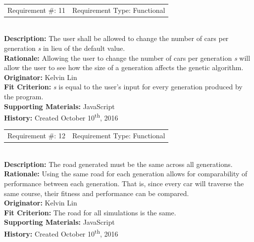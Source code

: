 \documentclass[12pt, titlepage]{article}
\begin{document}
\begin{reqbox}
	\begin{tabular}{cc}
		Requirement \#: 11 & Requirement Type: Functional \\
	\end{tabular} \\
	\textbf{Description:} The user shall be allowed to change the number of cars 
per 
	generation \textit{s} in lieu of the default value. \\
	\textbf{Rationale:} Allowing the user to change the number of cars per 
	generation \textit{s} will allow the user to see how the size of a generation 
	affects the genetic algorithm. \\
	\textbf{Originator:} Kelvin Lin\\
	\textbf{Fit Criterion:} \textit{s} is equal to the user's input for every 
	generation produced by the program.\\
	\textbf{Supporting Materials:} JavaScript \\
	\textbf{History:} Created October 10\textsuperscript{th}, 2016
\end{reqbox}

\newpage

\begin{reqbox}
	\begin{tabular}{cc}
		Requirement \#: 12 & Requirement Type: Functional \\
	\end{tabular} \\
	\textbf{Description:} The road generated must be the same across all 
	generations. \\
	\textbf{Rationale:} Using the same road for each generation allows for 
	comparability of performance between each generation. That is, since every car 
	will traverse the same course, their fitness and performance can be compared. 
\\
	\textbf{Originator:} Kelvin Lin\\
	\textbf{Fit Criterion:} The road for all simulations is the same. \\
	\textbf{Supporting Materials:} JavaScript \\
	\textbf{History:} Created October 10\textsuperscript{th}, 2016
\end{reqbox}
\end{document}
